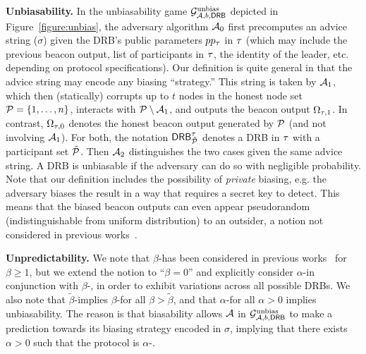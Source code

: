 \noindent\textbf{Unbiasability.}
In the unbiasability game $\mathcal{G}^\text{unbias}_{\mathcal{A}, b, \mathsf{DRB}}$ depicted in Figure~\ref{figure:unbias}, the adversary algorithm $\mathcal{A}_0$ first precomputes an advice string ($\sigma$) given the DRB's public parameters $pp_\tau$ in \epoch $\tau$ (which may include the previous beacon output, list of participants in \epoch $\tau$, the identity of the \epoch leader, etc. depending on protocol specifications).
Our definition is quite general in that the advice string may encode any biasing ``strategy.'' This string is taken by $\mathcal{A}_1$, which then (statically) corrupts up to $t$ nodes in the honest node set $\mathcal{P} = \{1, \dots, n\}$, interacts with $\mathcal{P}\setminus\mathcal{A}_1$, and outputs the beacon output $\Omega_{\tau, 1}$.
In contrast, $\Omega_{\tau, 0}$ denotes the honest beacon output generated by $\mathcal{P}$ (and not involving $\mathcal{A}_1$).
For both, the notation $\mathsf{DRB}^\tau_{\tilde{\mathcal{P}}}$ denotes a DRB in \epoch $\tau$ with a participant set $\tilde{\mathcal{P}}$.
Then $\mathcal{A}_2$ distinguishes the two cases given the same advice string.
A DRB is unbiasable if the adversary can do so with negligible probability.
Note that our definition includes the possibility of \emph{private} biasing, e.g. the adversary biases the result in a way that requires a secret key to detect.
This means that the biased beacon outputs can even appear pseudorandom (indistinguishable from uniform distribution) to an outsider, a notion not considered in previous works~\cite{bonneau2015bitcoin,das2021spurt,bhat2020randpiper}.

\noindent\textbf{Unpredictability.}
We note that $\beta$-\interunpredictability has been considered in previous works~\cite{bhat2020randpiper,bhat2022optrand} for $\beta \geq 1$, but we extend the notion to ``$\beta = 0$'' and explicitly consider $\alpha$-\intraunpredictability in conjunction with $\beta$-\interunpredictability, in order to exhibit variations across all possible DRBs.
We also note that $\tilde{\beta}$-\interunpredictability implies $\beta$-\interunpredictability for all $\beta > \tilde{\beta}$, and that $\alpha$-\intraunpredictability for all $\alpha > 0$ implies unbiasability.
The reason is that biasability allows $\mathcal{A}$ in $\mathcal{G}^\text{unbias}_{\mathcal{A}, b, \mathsf{DRB}}$ to make a prediction towards its biasing strategy encoded in $\sigma$, implying that there exists $\alpha > 0$ such that the protocol is $\alpha$-\intrapredictable.


